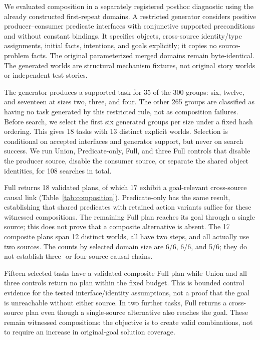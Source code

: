 We evaluated composition in a separately registered posthoc diagnostic using the already constructed first-repeat domains. A restricted generator considers positive producer--consumer predicate interfaces with conjunctive supported preconditions and without constant bindings. It specifies objects, cross-source identity/type assignments, initial facts, intentions, and goals explicitly; it copies no source-problem facts. The original parameterized merged domains remain byte-identical. The generated worlds are structural mechanism fixtures, not original story worlds or independent test stories.

The generator produces a supported task for 35 of the 300 groups: six, twelve, and seventeen at sizes two, three, and four. The other 265 groups are classified as having no task generated by this restricted rule, not as composition failures. Before search, we select the first six generated groups per size under a fixed hash ordering. This gives 18 tasks with 13 distinct explicit worlds. Selection is conditional on accepted interfaces and generator support, but never on search success. We run Union, Predicate-only, Full, and three Full controls that disable the producer source, disable the consumer source, or separate the shared object identities, for 108 searches in total.

Full returns 18 validated plans, of which 17 exhibit a goal-relevant cross-source causal link (Table~\ref{tab:composition}). Predicate-only has the same result, establishing that shared predicates with retained action variants suffice for these witnessed compositions. The remaining Full plan reaches its goal through a single source; this does not prove that a composite alternative is absent. The 17 composite plans span 12 distinct worlds, all have two steps, and all actually use two sources. The counts by selected domain size are 6/6, 6/6, and 5/6; they do not establish three- or four-source causal chains.



Fifteen selected tasks have a validated composite Full plan while Union and all three controls return no plan within the fixed budget. This is bounded control evidence for the tested interface/identity assumptions, not a proof that the goal is unreachable without either source. In two further tasks, Full returns a cross-source plan even though a single-source alternative also reaches the goal. These remain witnessed compositions: the objective is to create valid combinations, not to require an increase in original-goal solution coverage.

